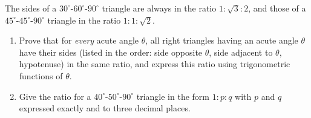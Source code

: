 The sides of a \(30^\circ\)-\(60^\circ\)-\(90^\circ\) triangle are always in the ratio \(1:\sqrt3:2\), and those of a \(45^\circ\)-\(45^\circ\)-\(90^\circ\) triangle in the ratio \(1:1:\sqrt2\).
\begin{enumerate}
\item[(a)] Prove that for \emph{every} acute angle \(\theta\), all right triangles having an acute angle \(\theta\) have their sides (listed in the order: side opposite \(\theta\), side adjacent to \(\theta\), hypotenuse) in the same ratio, and express this ratio using trigonometric functions of \(\theta\).
\item[(b)] Give the ratio for a \(40^\circ\)-\(50^\circ\)-\(90^\circ\) triangle in the form \(1:p:q\) with \(p\) and \(q\) expressed exactly and to three decimal places.
\end{enumerate}
